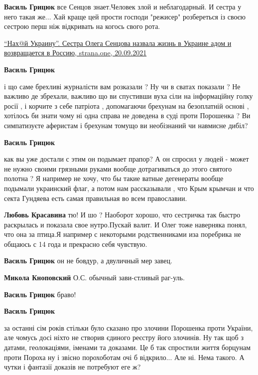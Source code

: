 \begin{itemize}
\begin{itemize} %
\textbf{Василь Грицюк} все Сенцов знает.Человек злой и неблагодарный. И сестра у него такая же...
Хай краще цей прости господи "режисер" розбереться із своєю сестрою перш ніж відкривать на когось свого рота.

\href{https://strana.one/news/354204-sestra-sentsova-nazvala-zhizn-v-ukraine-adom-i-vozvrashchaetsja-v-rossiju.html}{%
\enquote{Нах@й Украину}. Сестра Олега Сенцова назвала жизнь в Украине адом и возвращается в Россию, strana.one, 20.09.2021%
}

\textbf{Василь Грицюк} 

і що саме брехливі журналісти вам розказали ? Ну чи в сватах показали ? Не
важливо де збрехали, важливо що ви спустивши вуха сіли на інформаційну голку
росії , і корчите з себе патріота , допомагаючи брехунам на безоплатній основі
, хотілось би знати чому ні одна справа не доведена в суді проти Порошенка ? Ви
симпатизуєте аферистам і брехунам томущо ви необізнаний чи навмисне дибіл?


\textbf{Василь Грицюк} 

как вы уже достали с этим он подымает прапор? А он спросил у людей - может не
нужно своими грязными руками вообще дотрагиваться до этого святого полотна ? Я
например не хочу, что бы такие ватные дегенераты вообще подымали украинский
флаг, а потом нам рассказывали , что Крым крымчан и что секта Гундяева есть
самая правильная во всем православии.

\textbf{Любовь Красавина} тю! И шо ? Наоборот хорошо, что сестричка так быстро раскрылась и показала свое нутро.Пускай валит. И Олег тоже наверняка понял, что она за птица.Я например с некоторыми родственниками иза поребрика не общаюсь с 14 года и прекрасно себя чувствую.

\textbf{Василь Грицюк} он не бовдур, а двуличный мер завец.

\textbf{Микола Кноповский} О.С. обычный зави-стливый раг-уль.

\textbf{Василь Грицюк} браво!

\textbf{Василь Грицюк} 

за останні сім років стільки було сказано про злочини Порошенка проти України,
але чомусь досі ніхто не створив єдиного реєстру його злочинів. Ну так щоб з
датами, геолокаціями, іменами та доказами. Це б так спростили життя борцунам
проти Пороха ну і звісно порохоботам очі б відкрило... Але ні. Нема такого. А
чутки і фантазії доказів не потребуют еге ж?



\end{itemize}
\end{itemize}
